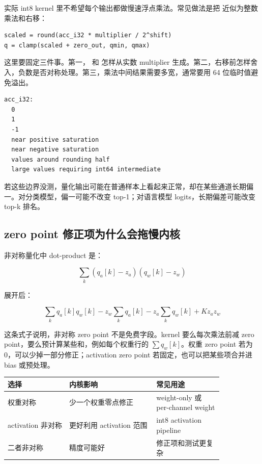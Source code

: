 实际 int8 kernel 里不希望每个输出都做慢速浮点乘法。常见做法是把  近似为整数乘法和右移：

\begin{lstlisting}[numbers=none,caption={固定点 requantize 的形态}]
scaled = round(acc_i32 * multiplier / 2^shift)
q = clamp(scaled + zero_out, qmin, qmax)
\end{lstlisting}

这里要固定三件事。第一， 和  怎样从实数 multiplier 生成。第二，右移前怎样舍入，负数是否对称处理。第三，乘法中间结果需要多宽，通常要用 64 位临时值避免溢出。

\begin{lstlisting}[numbers=none,caption={requantize 测试必须覆盖的值}]
acc_i32:
  0
  1
  -1
  near positive saturation
  near negative saturation
  values around rounding half
  large values requiring int64 intermediate
\end{lstlisting}

若这些边界没测，量化输出可能在普通样本上看起来正常，却在某些通道长期偏一。对分类模型，偏一可能不改变 top-1；对语言模型 logits，长期偏差可能改变 top-k 排名。

\subsection{zero point 修正项为什么会拖慢内核}

非对称量化中 dot-product 是：

\[
\sum_k (q_a[k]-z_a)(q_w[k]-z_w)
\]

展开后：

\[
\sum_k q_a[k]q_w[k]
- z_w\sum_k q_a[k]
- z_a\sum_k q_w[k]
+ K z_a z_w
\]

这条式子说明，非对称 zero point 不是免费字段。kernel 要么每次乘法前减 zero point，要么预计算某些和，例如每个权重行的 \(\sum q_w[k]\)。权重 zero point 若为 0，可以少掉一部分修正；activation zero point 若固定，也可以把某些项合并进 bias 或预处理。

\begin{center}
\begin{tabular}{p{0.24\linewidth}p{0.34\linewidth}p{0.26\linewidth}}
\toprule
选择 & 内核影响 & 常见用途 \\
\midrule
权重对称 & 少一个权重零点修正 & weight-only 或 per-channel weight \\
activation 非对称 & 更好利用 activation 范围 & int8 activation pipeline \\
二者非对称 & 精度可能好 & 修正项和测试更复杂 \\
\bottomrule
\end{tabular}
\end{center}

